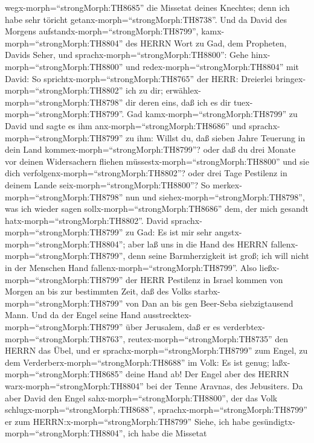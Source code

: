 wegx-morph=``strongMorph:TH8685'' die Missetat deines Knechtes; denn ich
habe sehr töricht getanx-morph=``strongMorph:TH8738''.  Und
da David des Morgens aufstandx-morph=``strongMorph:TH8799'',
kamx-morph=``strongMorph:TH8804'' des HERRN Wort zu Gad, dem Propheten,
Davids Seher, und sprachx-morph=``strongMorph:TH8800'': 
Gehe hinx-morph=``strongMorph:TH8800'' und
redex-morph=``strongMorph:TH8804'' mit David: So
sprichtx-morph=``strongMorph:TH8765'' der HERR: Dreierlei
bringex-morph=``strongMorph:TH8802'' ich zu dir;
erwählex-morph=``strongMorph:TH8798'' dir deren eins, daß ich es dir
tuex-morph=``strongMorph:TH8799''.  Gad
kamx-morph=``strongMorph:TH8799'' zu David und sagte es ihm
anx-morph=``strongMorph:TH8686'' und
sprachx-morph=``strongMorph:TH8799'' zu ihm: Willst du, daß sieben Jahre
Teuerung in dein Land kommex-morph=``strongMorph:TH8799''? oder daß du
drei Monate vor deinen Widersachern fliehen
müssestx-morph=``strongMorph:TH8800'' und sie dich
verfolgenx-morph=``strongMorph:TH8802''? oder drei Tage Pestilenz in
deinem Lande seix-morph=``strongMorph:TH8800''? So
merkex-morph=``strongMorph:TH8798'' nun und
siehex-morph=``strongMorph:TH8798'', was ich wieder sagen
sollx-morph=``strongMorph:TH8686'' dem, der mich gesandt
hatx-morph=``strongMorph:TH8802''.  David
sprachx-morph=``strongMorph:TH8799'' zu Gad: Es ist mir sehr
angstx-morph=``strongMorph:TH8804''; aber laß uns in die Hand des HERRN
fallenx-morph=``strongMorph:TH8799'', denn seine Barmherzigkeit ist
groß; ich will nicht in der Menschen Hand
fallenx-morph=``strongMorph:TH8799''.  Also
ließx-morph=``strongMorph:TH8799'' der HERR Pestilenz in Israel kommen
von Morgen an bis zur bestimmten Zeit, daß des Volks
starbx-morph=``strongMorph:TH8799'' von Dan an bis gen Beer-Seba
siebzigtausend Mann.  Und da der Engel seine Hand
ausstrecktex-morph=``strongMorph:TH8799'' über Jerusalem, daß er es
verderbtex-morph=``strongMorph:TH8763'',
reutex-morph=``strongMorph:TH8735'' den HERRN das Übel, und er
sprachx-morph=``strongMorph:TH8799'' zum Engel, zu dem
Verderberx-morph=``strongMorph:TH8688'' im Volk: Es ist genug;
laßx-morph=``strongMorph:TH8685'' deine Hand ab! Der Engel aber des
HERRN warx-morph=``strongMorph:TH8804'' bei der Tenne Aravnas, des
Jebusiters.  Da aber David den Engel
sahx-morph=``strongMorph:TH8800'', der das Volk
schlugx-morph=``strongMorph:TH8688'',
sprachx-morph=``strongMorph:TH8799'' er zum
HERRN:x-morph=``strongMorph:TH8799'' Siehe, ich habe
gesündigtx-morph=``strongMorph:TH8804'', ich habe die Missetat
